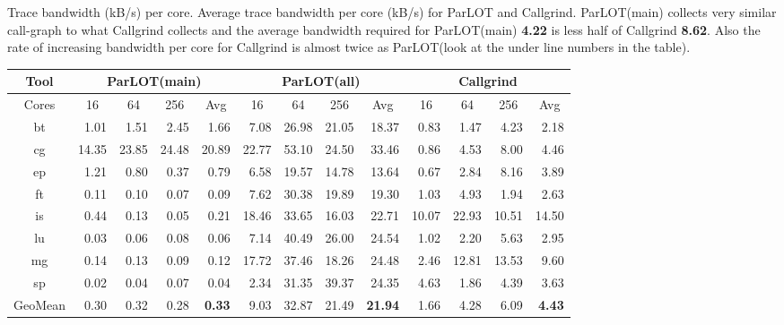 \label{t_ts}
\caption{Trace bandwidth (kB/s) per core. Average trace bandwidth per core (kB/s) for ParLOT and Callgrind. ParLOT(main) collects very similar call-graph to what Callgrind collects and the average bandwidth required for ParLOT(main) \textbf{4.22} is less half of Callgrind \textbf{8.62}. Also the rate of increasing bandwidth per core for Callgrind is almost twice as ParLOT(look at the \text under line numbers in the table).}

\begin{tabular}{|c|rrrr|rrrr|rrrr|}
\hline
Tool & \multicolumn{4}{c|}{ParLOT(main)} & \multicolumn{4}{c|}{ParLOT(all)} & \multicolumn{4}{c|}{Callgrind} \\ \hline
Cores & \multicolumn{1}{c}{16} & \multicolumn{1}{c}{64} & \multicolumn{1}{c}{256} & \multicolumn{1}{c|}{Avg} & \multicolumn{1}{c}{16} & \multicolumn{1}{c}{64} & \multicolumn{1}{c}{256} & \multicolumn{1}{c|}{Avg} & \multicolumn{1}{c}{16} & \multicolumn{1}{c}{64} & \multicolumn{1}{c}{256} & \multicolumn{1}{c|}{Avg} \\ \hline
bt & 1.01 & 1.51 & 2.45 & 1.66 & 7.08 & 26.98 & 21.05 & 18.37 & 0.83 & 1.47 & 4.23 & 2.18 \\
cg & 14.35 & 23.85 & 24.48 & 20.89 & 22.77 & 53.10 & 24.50 & 33.46 & 0.86 & 4.53 & 8.00 & 4.46 \\
ep & 1.21 & 0.80 & 0.37 & 0.79 & 6.58 & 19.57 & 14.78 & 13.64 & 0.67 & 2.84 & 8.16 & 3.89 \\
ft & 0.11 & 0.10 & 0.07 & 0.09 & 7.62 & 30.38 & 19.89 & 19.30 & 1.03 & 4.93 & 1.94 & 2.63 \\
is & 0.44 & 0.13 & 0.05 & 0.21 & 18.46 & 33.65 & 16.03 & 22.71 & 10.07 & 22.93 & 10.51 & 14.50 \\
lu & 0.03 & 0.06 & 0.08 & 0.06 & 7.14 & 40.49 & 26.00 & 24.54 & 1.02 & 2.20 & 5.63 & 2.95 \\
mg & 0.14 & 0.13 & 0.09 & 0.12 & 17.72 & 37.46 & 18.26 & 24.48 & 2.46 & 12.81 & 13.53 & 9.60 \\
sp & 0.02 & 0.04 & 0.07 & 0.04 & 2.34 & 31.35 & 39.37 & 24.35 & 4.63 & 1.86 & 4.39 & 3.63 \\ \hline
GeoMean & 0.30 & 0.32 & 0.28 & \textbf{0.33} & 9.03 & 32.87 & 21.49 & \textbf{21.94} & 1.66 & 4.28 & 6.09 & \textbf{4.43} \\ \hline
\end{tabular}
